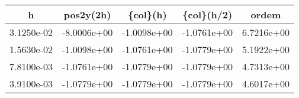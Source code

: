 \begin{table}[htb]
    \centering
    \begin{tabular}{@{}ccccc@{}}
        \toprule
        h & pos2y(2h) & \{col\}(h) & \{col\}(h/2) & ordem \\ \hline
        \midrule
        3.1250e-02 & -8.0006e+00 & -1.0098e+00 & -1.0761e+00 & 6.7216e+00 \\ \hline
        1.5630e-02 & -1.0098e+00 & -1.0761e+00 & -1.0779e+00 & 5.1922e+00 \\ \hline
        7.8100e-03 & -1.0761e+00 & -1.0779e+00 & -1.0779e+00 & 4.7313e+00 \\ \hline
        3.9100e-03 & -1.0779e+00 & -1.0779e+00 & -1.0779e+00 & 4.6017e+00 \\ \hline
        \bottomrule
    \end{tabular}
\end{table}
